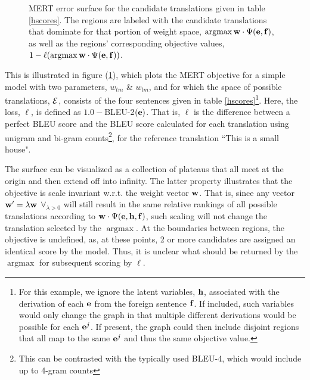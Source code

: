 \documentclass[11pt]{article}
\DeclareMathOperator*{\argmax}{argmax}
\begin{document}
\begin{figure}[h]
\vskip 0.2in
\begin{center}
\setlength{\epsfxsize}{2.5in}
\centerline{}
\vskip -0.15in
\caption{MERT error surface for the candidate translations given in table \ref{hscores}. The regions are labeled with the candidate translations that dominate for that portion of weight space, $\argmax {\bf w} \cdot \Psi({\bf e}, {\bf f})$, as well as the regions' corresponding objective values, $1-\ell(\argmax {\bf w} \cdot \Psi({\bf e}, {\bf f}))$. 
\label{mertsurface}
}
\end{center}
\vskip -0.2in
\end{figure}


This is illustrated in figure (\ref{mertsurface}), which plots the MERT objective for a simple model with two parameters, $w_{tm}$ \& $w_{lm}$, and for which the space of possible translations, ${\cal E}$, consists of the four sentences given in table \ref{hscores}\footnote{For this example, we ignore the latent variables, ${\bf h}$, associated with the derivation of each ${\bf e}$ from the foreign sentence ${\bf f}$. If included, such variables would only change the graph in that  multiple different derivations would be possible for each ${\bf e}^j$. If present, the graph could then include disjoint regions that all map to the same ${\bf e}^j$ and thus the same objective value.}. Here, the loss, $\ell$, is defined as $1.0 - $BLEU-2$({\bf e})$. That is, $\ell$ is the difference between a perfect BLEU score and the BLEU score calculated for each translation using unigram and bi-gram counts\footnote{This can be contrasted with the typically used BLEU-4, which would include up to 4-gram counts}, for the reference translation ``This is a small house". 

The surface can be visualized as a collection of plateaus that all meet at the origin and then extend off into infinity. The latter property illustrates that the objective is scale invariant w.r.t. the weight vector ${\bf w}$. That is, since any vector ${\bf w}^\prime = \lambda {\bf w}$ $\forall_{\lambda > 0}$ will still result in the same relative rankings of all possible translations according to ${\bf w} \cdot \Psi({\bf e}, {\bf h}, {\bf f})$, such scaling will not change the translation selected by the $\argmax$. At the boundaries between regions, the objective is undefined, as, at these points, 2 or more candidates are assigned an identical score by the model. Thus, it is unclear what should be returned by the $\argmax$ for subsequent scoring by $\ell$.
\end{document}
